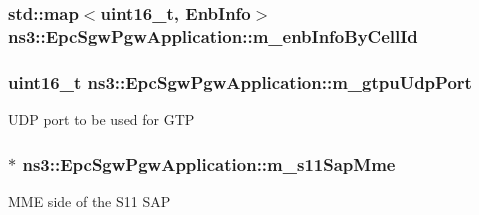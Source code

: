 \subsubsection[{\texorpdfstring{m\+\_\+enb\+Info\+By\+Cell\+Id}{m_enbInfoByCellId}}]{\setlength{\rightskip}{0pt plus 5cm}std\+::map$<$uint16\+\_\+t, {\bf Enb\+Info}$>$ ns3\+::\+Epc\+Sgw\+Pgw\+Application\+::m\+\_\+enb\+Info\+By\+Cell\+Id\hspace{0.3cm}{\ttfamily [private]}}\hypertarget{classns3_1_1EpcSgwPgwApplication_afa8f803a667fc1c54fc855a8a3d8e550}{}\label{classns3_1_1EpcSgwPgwApplication_afa8f803a667fc1c54fc855a8a3d8e550}
\subsubsection[{\texorpdfstring{m\+\_\+gtpu\+Udp\+Port}{m_gtpuUdpPort}}]{\setlength{\rightskip}{0pt plus 5cm}uint16\+\_\+t ns3\+::\+Epc\+Sgw\+Pgw\+Application\+::m\+\_\+gtpu\+Udp\+Port\hspace{0.3cm}{\ttfamily [private]}}\hypertarget{classns3_1_1EpcSgwPgwApplication_aaf54b6467029f7c3f038da709da10a09}{}\label{classns3_1_1EpcSgwPgwApplication_aaf54b6467029f7c3f038da709da10a09}
U\+DP port to be used for G\+TP 
\subsubsection[{\texorpdfstring{m\+\_\+s11\+Sap\+Mme}{m_s11SapMme}}]{$\ast$ ns3\+::\+Epc\+Sgw\+Pgw\+Application\+::m\+\_\+s11\+Sap\+Mme\hspace{0.3cm}{\ttfamily [private]}}\hypertarget{classns3_1_1EpcSgwPgwApplication_a37809771f2d925005b7deab8c5a2de3c}{}\label{classns3_1_1EpcSgwPgwApplication_a37809771f2d925005b7deab8c5a2de3c}
M\+ME side of the S11 S\+AP 

